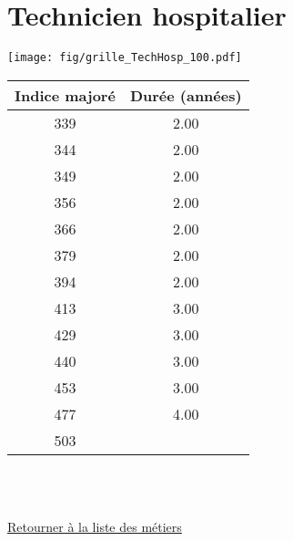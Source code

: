 \newpage 
 
\chapter{Technicien hospitalier} 

\begin{minipage}{0.55\linewidth}\texttt{[image: fig/grille\_TechHosp\_100.pdf]}\end{minipage} 
\begin{minipage}{0.3\linewidth} 
 \begin{center} 

\begin{tabular}[htb]{|c|c|} 
\hline 
 Indice majoré &  Durée (années) \\ 
\hline \hline 
 339 &  2.00 \\ 
\hline 
 344 &  2.00 \\ 
\hline 
 349 &  2.00 \\ 
\hline 
 356 &  2.00 \\ 
\hline 
 366 &  2.00 \\ 
\hline 
 379 &  2.00 \\ 
\hline 
 394 &  2.00 \\ 
\hline 
 413 &  3.00 \\ 
\hline 
 429 &  3.00 \\ 
\hline 
 440 &  3.00 \\ 
\hline 
 453 &  3.00 \\ 
\hline 
 477 &  4.00 \\ 
\hline 
 503 &   \\ 
\hline 
\hline 
\end{tabular} 
\end{center} 
 \end{minipage} 

~\\ 
 


   
 \localtableofcontents 

~\\ 
 
 \hyperlink{page.2}{\noindent Retourner à la liste des métiers}

 \newpage 

